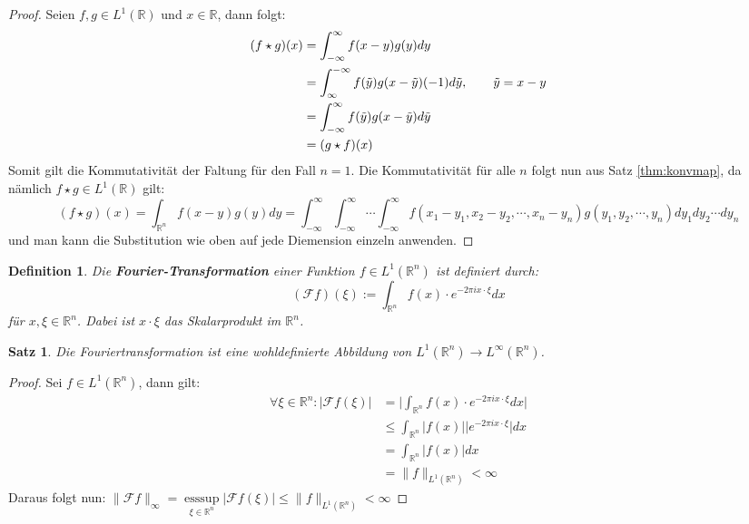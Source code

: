 \documentclass{article}
\newcommand{\R}[0]{\mathbb{R}}
\newtheorem{defin}{Definition}
\newtheorem{thm}{Satz}
\DeclareMathOperator{\esssup}{esssup}
\begin{document}
\begin{proof}
    Seien $f,g \in L^1(\R)$ und $x \in \R$, dann folgt:
    \begin{align*}
        (f \star g)(x) &= \int_{-\infty}^{\infty} f(x - y) g(y) dy \\
        &= \int_{\infty}^{-\infty} f(\tilde{y}) g(x - \tilde{y}) (-1)d\tilde{y}, \hspace{20px} \tilde{y} = x - y \\
        &= \int_{-\infty}^{\infty} f(\tilde{y}) g(x - \tilde{y}) d\tilde{y} \\
        &= (g \star f)(x)
    \end{align*}
    Somit gilt die Kommutativität der Faltung für den Fall $n=1$. Die Kommutativität für alle $n$ folgt nun aus Satz \ref{thm:konvmap}, da nämlich
    $f \star g \in L^1(\R)$ gilt:
    \begin{equation*}
        (f \star g)(x) = \int_{\R^n} f(x - y)g(y) dy = \int_{-\infty}^{\infty} \int_{-\infty}^{\infty} \cdots \int_{-\infty}^{\infty} f(x_1 - y_1, x_2 - y_2, \cdots, x_n - y_n) g(y_1, y_2, \cdots, y_n) dy_1 dy_2 \cdots dy_n
    \end{equation*}
    und man kann die Substitution wie oben auf jede Diemension einzeln anwenden.
\end{proof}

\begin{defin} Die \textbf{Fourier-Transformation} einer Funktion $f \in L^1(\R^n)$ ist definiert durch:
    \begin{equation}
        (\mathcal{F}f)(\xi) := \int_{\R^n} f(x) \cdot e^{-2\pi i x \cdot \xi} dx
    \end{equation}
    für $x, \xi \in \R^n$. Dabei ist $x \cdot \xi$ das Skalarprodukt im $\R^n$.
\end{defin}

\begin{thm}\label{thm:ft-map}
    Die Fouriertransformation ist eine wohldefinierte Abbildung von $L^1(\R^n) \to L^{\infty}(\R^n)$.
\end{thm}

\begin{proof}
    Sei $f \in L^1(\R^n)$, dann gilt:
    \begin{align*}
        \forall \xi \in \R^n: |\mathcal{F}f(\xi)| &= \Bigg\lvert \int_{\R^n} f(x) \cdot e^{-2\pi i x \cdot \xi} dx \Bigg\rvert \\
        &\leq \int_{\R^n} \lvert f(x) \rvert \lvert e^{-2\pi i x \cdot \xi} \rvert dx \\
        &= \int_{\R^n} \lvert f(x) \rvert dx \\
        &= \lVert f \rVert_{L^1(\R^n)} < \infty
    \end{align*}
    Daraus folgt nun: $\lVert\mathcal{F}f\rVert_{\infty} = \esssup\limits_{\xi \in \R^n} |\mathcal{F}f(\xi)| \leq \lVert f \rVert_{L^1(\R^n)} < \infty$
\end{proof}
\end{document}
